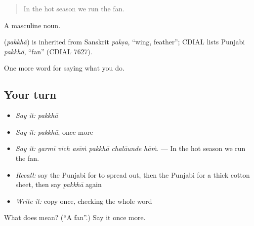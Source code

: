 \begin{quote}
In the hot season we run the fan.
\end{quote}

A masculine noun.

\begin{cousinweb}
\textbf{} (\emph{pakkhā}) is inherited from Sanskrit \emph{pakṣa}, \textquotedblleft{}wing, feather\textquotedblright{}; CDIAL lists Punjabi \emph{pakkhā}, \textquotedblleft{}fan\textquotedblright{} (CDIAL 7627).
\end{cousinweb}

\begin{grammarlens}[title={What you've built}]
One more word for saying what you do.
\end{grammarlens}

\subsection*{Your turn}
\begin{itemize}
\raggedright
  \item \emph{Say it:} \emph{pakkhā}
  \item \emph{Say it:} \emph{pakkhā}, once more
  \item \emph{Say it:} \emph{garmī vich asīṁ pakkhā chalāunde hāṁ.} — In the hot season we run the fan.
  \item \emph{Recall:} say the Punjabi for to spread out, then the Punjabi for a thick cotton sheet, then say \emph{pakkhā} again
  \item \emph{Write it:} copy \textbf{} once, checking the whole word
\end{itemize}

\begin{tcolorbox}[breakable,colback=teal!4,colframe=teal!35!black,title={Before you move on}]
What does  mean? (\textquotedblleft{}A fan\textquotedblright{}.) Say it once more.
\end{tcolorbox}

